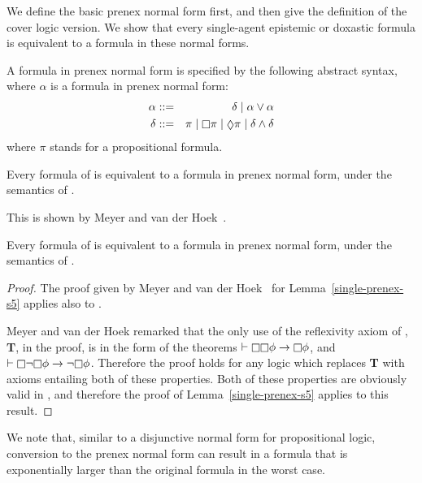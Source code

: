 We define the basic prenex normal form first, and then give the definition of
the cover logic version. We show that every single-agent epistemic or doxastic
formula is equivalent to a formula in these normal forms.

\begin{definition}\label{single-prenex}
A formula in prenex normal form is specified by the following abstract syntax,
where $\alpha$ is a formula in prenex normal form: 
\begin{eqnarray*}
\alpha &::=& \delta \bnfalt \alpha \lor \alpha\\
\delta &::=&    \pi \bnfalt
                \knows \pi \bnfalt
                \suspects \pi \bnfalt
                \delta \land \delta
\end{eqnarray*}
where $\pi$ stands for a propositional formula.
\end{definition}

\begin{lemma}\label{single-prenex-s5}
Every formula of \langi{} is equivalent to a formula in prenex normal form, under
the semantics of \logicSi{}.
\end{lemma}

This is shown by Meyer and van der Hoek~\cite{meyer2004epistemic}.

\begin{lemma}\label{single-prenex-kd45}
Every formula of \langi{} is equivalent to a formula in prenex normal form, under
the semantics of \logicKDi{}.
\end{lemma}

\begin{proof}
The proof given by Meyer and van der Hoek~\cite{meyer2004epistemic} for
Lemma~\ref{single-prenex-s5} applies also to \logicKDi{}.

Meyer and van der Hoek remarked that the only use of the reflexivity axiom of
\logicS{}, {\bf T}, in the proof, is in the form of the theorems $\proves \knows
\knows \phi \implies \knows \phi$, and $\proves \knows \neg \knows \phi \implies
\neg \knows \phi$. Therefore the proof holds for any logic which replaces {\bf
T} with axioms entailing both of these properties. Both of these properties are
obviously valid in \logicKDi{}, and therefore the proof of
Lemma~\ref{single-prenex-s5} applies to this result.
\end{proof}

We note that, similar to a disjunctive normal form for propositional logic,
conversion to the prenex normal form can result in a formula that is
exponentially larger than the original formula in the worst case.

